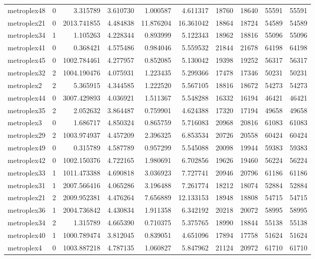 \begin{longtable}{|l|r|r|r|r|r|r|r|r|r|}
metroplex48 & 0 & 3.315789 & 3.610730 & 1.000587 & 4.611317 & 18760 & 18640 & 55591 & 55591 \\
metroplex21 & 0 & 2013.741855 & 4.484838 & 11.876204 & 16.361042 & 18864 & 18724 & 54589 & 54589 \\
metroplex34 & 1 & 1.105263 & 4.228344 & 0.893999 & 5.122343 & 18962 & 18816 & 55096 & 55096 \\
metroplex41 & 0 & 0.368421 & 4.575486 & 0.984046 & 5.559532 & 21844 & 21678 & 64198 & 64198 \\
metroplex45 & 0 & 1002.784461 & 4.277957 & 0.852085 & 5.130042 & 19398 & 19252 & 56317 & 56317 \\
metroplex32 & 2 & 1004.190476 & 4.075931 & 1.223435 & 5.299366 & 17478 & 17346 & 50231 & 50231 \\
metroplex2 & 2 & 5.365915 & 4.344585 & 1.222520 & 5.567105 & 18816 & 18672 & 54273 & 54273 \\
metroplex44 & 0 & 3007.429893 & 4.036921 & 1.511367 & 5.548288 & 16332 & 16194 & 46421 & 46421 \\
metroplex35 & 2 & 2.052632 & 3.864487 & 0.759901 & 4.624388 & 17320 & 17194 & 49658 & 49658 \\
metroplex3 & 0 & 1.686717 & 4.850324 & 0.865759 & 5.716083 & 20968 & 20816 & 61083 & 61083 \\
metroplex29 & 2 & 1003.974937 & 4.457209 & 2.396325 & 6.853534 & 20726 & 20558 & 60424 & 60424 \\
metroplex49 & 0 & 0.315789 & 4.587789 & 0.957299 & 5.545088 & 20098 & 19944 & 59383 & 59383 \\
metroplex42 & 0 & 1002.150376 & 4.722165 & 1.980691 & 6.702856 & 19626 & 19460 & 56224 & 56224 \\
metroplex33 & 1 & 1011.473388 & 4.690818 & 3.036923 & 7.727741 & 20946 & 20796 & 61186 & 61186 \\
metroplex31 & 1 & 2007.566416 & 4.065286 & 3.196488 & 7.261774 & 18212 & 18074 & 52884 & 52884 \\
metroplex21 & 2 & 2009.952381 & 4.476264 & 7.656889 & 12.133153 & 18948 & 18808 & 54715 & 54715 \\
metroplex36 & 1 & 2004.736842 & 4.430834 & 1.911358 & 6.342192 & 20218 & 20072 & 58995 & 58995 \\
metroplex34 & 2 & 1.315789 & 4.665390 & 0.710375 & 5.375765 & 18990 & 18844 & 55138 & 55138 \\
metroplex40 & 1 & 1000.789474 & 3.812045 & 0.839051 & 4.651096 & 17894 & 17758 & 51624 & 51624 \\
metroplex4 & 0 & 1003.887218 & 4.787135 & 1.060827 & 5.847962 & 21124 & 20972 & 61710 & 61710 \\

\end{longtable}
